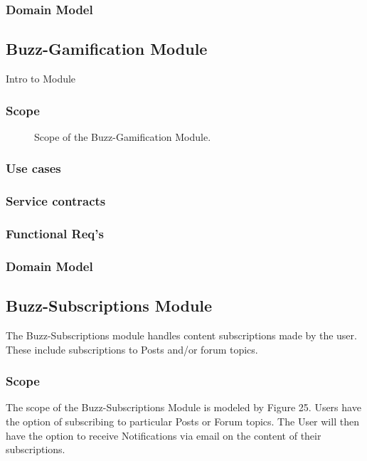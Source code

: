 \documentclass[12pt]{article}
\begin{document}
\subsubsection{Domain Model}

\subsection{Buzz-Gamification Module}
\par{Intro to Module}
\subsubsection{Scope}
\par{}

\begin{figure}[h]
\iffalse\texttt{[image: Diagrams/scopeGamification.jpeg]}\fi
\caption{Scope of the Buzz-Gamification Module.}
\label{Use-case: Buzz-Gamification}
\end{figure}

\subsubsection{Use cases}
\subsubsection{Service contracts}
\subsubsection{Functional Req's}
\subsubsection{Domain Model}

\subsection{Buzz-Subscriptions Module}
\par{The Buzz-Subscriptions module handles content subscriptions made by the user. These include subscriptions to Posts and/or forum topics.}
\subsubsection{Scope}
\par{The scope of the Buzz-Subscriptions Module is modeled by Figure 25. Users have the option of subscribing to particular Posts or Forum topics. The User will then have the option to receive Notifications via email on the content of their subscriptions.}
\end{document}
